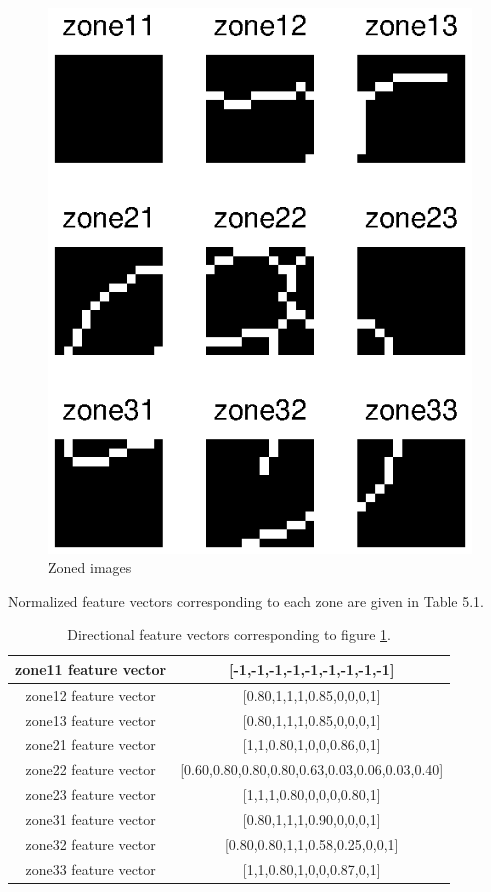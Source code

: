 \begin{figure}[h]
\centering
\includegraphics[scale =1]{figures/ka_features/ka_zoned.eps}
\caption{Zoned images}
\label{figure_ka_zoned}
\end{figure}

Normalized feature vectors corresponding to each zone are given in Table 5.1. %

\captionsetup[table]{list=no}
\begin{table}[h]
\label{table_directional_feature_vectors}
\centering
\begin{tabular}{|c|c|}
\hline  zone11 feature vector & [-1,-1,-1,-1,-1,-1,-1,-1,-1] \\ 
\hline  zone12 feature vector&  [0.80,1,1,1,0.85,0,0,0,1]\\ 
\hline  zone13 feature vector&  [0.80,1,1,1,0.85,0,0,0,1]\\ 
\hline  zone21 feature vector&  [1,1,0.80,1,0,0,0.86,0,1]\\ 
\hline  zone22 feature vector&  [0.60,0.80,0.80,0.80,0.63,0.03,0.06,0.03,0.40]\\ 
\hline  zone23 feature vector&  [1,1,1,0.80,0,0,0,0.80,1]\\ 
\hline  zone31 feature vector&  [0.80,1,1,1,0.90,0,0,0,1]\\ 
\hline  zone32 feature vector&  [0.80,0.80,1,1,0.58,0.25,0,0,1]\\ 
\hline  zone33 feature vector&  [1,1,0.80,1,0,0,0.87,0,1]\\ 
\hline 
\end{tabular}
\caption{Directional feature vectors corresponding to figure \ref{figure_ka_zoned}.}
\end{table}
\captionsetup[table]{list=yes}

